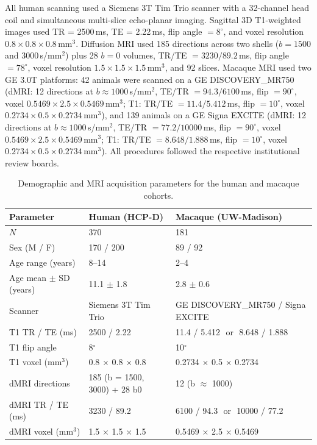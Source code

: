 \documentclass[11pt]{article}
\begin{document}
All human scanning used a Siemens 3T Tim Trio scanner with a 32-channel head coil and simultaneous multi-slice echo-planar imaging. Sagittal 3D T1-weighted images used TR = 2500\,ms, TE = 2.22\,ms, flip angle $= 8^{\circ}$, and voxel resolution $0.8 \times 0.8 \times 0.8$\,mm$^3$. Diffusion MRI used 185 directions across two shells ($b = 1500$ and $3000$\,s/mm$^2$) plus 28 $b = 0$ volumes, TR/TE $= 3230/89.2$\,ms, flip angle $= 78^{\circ}$, voxel resolution $1.5 \times 1.5 \times 1.5$\,mm$^3$, and 92 slices. Macaque MRI used two GE 3.0T platforms: 42 animals were scanned on a GE DISCOVERY\_MR750 (dMRI: 12 directions at $b \approx 1000$\,s/mm$^2$, TE/TR $= 94.3/6100$\,ms, flip $= 90^{\circ}$, voxel $0.5469 \times 2.5 \times 0.5469$\,mm$^3$; T1: TR/TE $= 11.4/5.412$\,ms, flip $= 10^{\circ}$, voxel $0.2734 \times 0.5 \times 0.2734$\,mm$^3$), and 139 animals on a GE Signa EXCITE (dMRI: 12 directions at $b \approx 1000$\,s/mm$^2$, TE/TR $= 77.2/10000$\,ms, flip $= 90^{\circ}$, voxel $0.5469 \times 2.5 \times 0.5469$\,mm$^3$; T1: TR/TE $= 8.648/1.888$\,ms, flip $= 10^{\circ}$, voxel $0.2734 \times 0.5 \times 0.2734$\,mm$^3$). All procedures followed the respective institutional review boards.

\begin{table}[htbp]
\centering
\caption{Demographic and MRI acquisition parameters for the human and macaque cohorts.}
\label{tab:demographics}
\small
\begin{tabular}{lll}
\toprule
Parameter & Human (HCP-D) & Macaque (UW-Madison) \\
\midrule
$N$ & 370 & 181 \\
Sex (M / F) & 170 / 200 & 89 / 92 \\
Age range (years) & 8--14 & 2--4 \\
Age mean $\pm$ SD (years) & 11.1 $\pm$ 1.8 & 2.8 $\pm$ 0.6 \\
Scanner & Siemens 3T Tim Trio & GE DISCOVERY\_MR750 / Signa EXCITE \\
T1 TR / TE (ms) & 2500 / 2.22 & 11.4 / 5.412 \,\,or\,\, 8.648 / 1.888 \\
T1 flip angle & 8$^{\circ}$ & 10$^{\circ}$ \\
T1 voxel (mm$^3$) & 0.8 $\times$ 0.8 $\times$ 0.8 & 0.2734 $\times$ 0.5 $\times$ 0.2734 \\
dMRI directions & 185 (b = 1500, 3000) + 28 b0 & 12 (b $\approx$ 1000) \\
dMRI TR / TE (ms) & 3230 / 89.2 & 6100 / 94.3 \,\,or\,\, 10000 / 77.2 \\
dMRI voxel (mm$^3$) & 1.5 $\times$ 1.5 $\times$ 1.5 & 0.5469 $\times$ 2.5 $\times$ 0.5469 \\
\bottomrule
\end{tabular}
\end{table}
\end{document}
